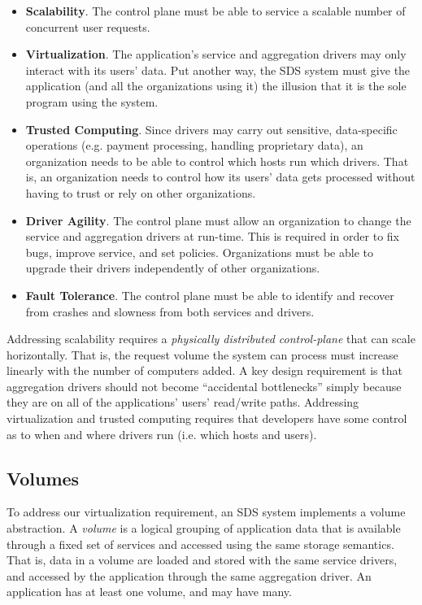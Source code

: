 \begin{itemize}
    \item \textbf{Scalability}.  The control plane must be able to service a
    scalable number of concurrent user requests. 
    \item \textbf{Virtualization}.  The application's service and aggregation
    drivers may only interact with its users' data.  Put another way,
      the SDS system must give the application (and all the organizations using
      it) the illusion that it is the sole program using the system.
    \item \textbf{Trusted Computing}.  Since drivers may carry out sensitive,
    data-specific operations (e.g. payment processing, handling proprietary
    data), an organization needs to be able to control which hosts run which
    drivers.  That is, an organization needs to
    control how its users' data gets processed without having to trust or rely
    on other organizations.
    \item \textbf{Driver Agility}.  The control plane must allow an organization to
    change the service and aggregation drivers at run-time.
    This is required in order to fix bugs, improve service, and set policies.
    Organizations must be able to upgrade their drivers independently of other organizations.
    \item \textbf{Fault Tolerance}.  The control plane must be able to identify
    and recover from crashes and slowness from both services and drivers.
\end{itemize}

Addressing scalability requires a \emph{physically distributed control-plane} that can
scale horizontally.  That is, the request volume the system can process must
increase linearly with the number of computers added.
A key design requirement is that aggregation drivers should not become ``accidental
bottlenecks'' simply because they are on all of the applications' users' read/write paths.
Addressing virtualization and trusted computing requires that developers have some
control as to when and where drivers run (i.e. which hosts and users).

\subsection{Volumes}

To address our virtualization requirement, an SDS system
implements a volume abstraction.  A \emph{volume} is a logical grouping of
application data that is available through a fixed set of services and accessed
using the same storage semantics.  That is, data in a volume are loaded and
stored with the same service drivers, and accessed by the application through
the same aggregation driver.  An application has at least one volume, and may have many.

